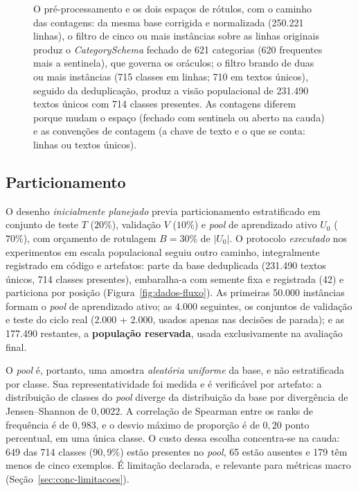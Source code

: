 \begin{figure}[htbp]
    \centering
    
    \caption{O pré-processamento e os dois espaços de rótulos, com o caminho
    das contagens: da mesma base corrigida e normalizada (250.221 linhas), o
    filtro de cinco ou mais instâncias sobre as linhas originais produz o
    \textit{CategorySchema} fechado de 621 categorias (620 frequentes mais a
    sentinela), que governa os oráculos; o filtro brando de duas ou mais
    instâncias (715 classes em linhas; 710 em textos únicos), seguido da
    deduplicação, produz a visão populacional de 231.490 textos únicos com
    714 classes presentes. As contagens diferem porque mudam o espaço
    (fechado com sentinela ou aberto na cauda) e as convenções de contagem (a
    chave de texto e o que se conta: linhas ou textos únicos).}
    \label{fig:metodo-preproc-classes}
\end{figure}

\subsection{Particionamento}
\label{sec:metodo-dados-particionamento}

O desenho \emph{inicialmente planejado} previa particionamento estratificado em
conjunto de teste $T$ ($20\%$), validação $V$ ($10\%$) e \textit{pool} de
aprendizado ativo $U_0$ ($70\%$), com orçamento de rotulagem $B = 30\%$ de
$|U_0|$. O protocolo \emph{executado} nos experimentos em escala populacional
seguiu outro caminho, integralmente registrado em código e artefatos: parte da
base deduplicada (231.490 textos únicos, 714 classes presentes), embaralha-a com
semente fixa e registrada (42) e particiona por posição
(Figura~\ref{fig:dados-fluxo}). As primeiras 50.000 instâncias formam o
\textit{pool} de aprendizado ativo; as 4.000 seguintes, os conjuntos de validação
e teste do ciclo real (2.000 + 2.000, usados apenas nas decisões de parada); e as
177.490 restantes, a \textbf{população reservada}, usada exclusivamente na
avaliação final.

O \textit{pool} é, portanto, uma amostra \emph{aleatória uniforme} da base, e não
estratificada por classe. Sua representatividade foi medida e é verificável por
artefato: a distribuição de classes do \textit{pool} diverge da distribuição da
base por divergência de Jensen--Shannon de $0{,}0022$. A correlação de Spearman
entre os ranks de frequência é de $0{,}983$, e o desvio máximo de proporção é de
$0{,}20$ ponto percentual, em uma única classe. O custo dessa escolha concentra-se na cauda: 649
das 714 classes ($90{,}9\%$) estão presentes no \textit{pool}, 65 estão ausentes e
179 têm menos de cinco exemplos. É limitação declarada, e relevante para métricas
macro (Seção~\ref{sec:conc-limitacoes}).

